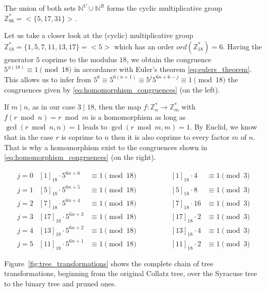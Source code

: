 \par\medskip
The union of both sets $\mathbb{N}^U\cup\mathbb{N}^R$ forms the cyclic multiplicative group $\mathbb{Z}^\ast_{96}=<\{5, 17, 31\}>$.

\par\medskip
Let us take a closer look at the (cyclic) multiplicative group $\mathbb{Z}^\ast_{18}=\{1,5,7,11,13,17\}=<5>$ which has an order $ord(\mathbb{Z}^\ast_{18})=6$. Having the generator $5$ coprime to the modulus $18$, we obtain the congruence $5^{\phi(18)}\equiv1\pmod{18}$ in accordance with Euler's theorem \ref{eq:eulers_theorem}. This allows us to infer from $5^6\equiv5^{6(n+1)}\equiv5^j5^{6n+6-j}\equiv1\pmod{18}$ the congruences given by \ref{eq:homomorphism_congruences} (on the left).

If $m\mid n$, as in our case $3\mid18$, then the map $f:\mathbb{Z}^\ast_n\rightarrow \mathbb{Z}^\ast_m$ with $f(r\bmod n)=r\bmod m$ is a homomorphism as long as $\gcd(r\bmod n,n)=1$ leads to $\gcd(r\bmod m,m)=1$. By Euclid, we know that in the case $r$ is coprime to $n$ then it is also coprime to every factor $m$ of $n$. That is why a homomorphism exist to the congruences shown in \ref{eq:homomorphism_congruences} (on the right).

\begin{equation}
\label{eq:homomorphism_congruences}
\begin{array}{lllll}
	j=0 & [1]_{18}\cdot5^{6n+6}&\equiv1\pmod{18}&\hspace{4em}[1]_{18}\cdot4 &\equiv1\pmod{3}\\
	j=1 & [5]_{18}\cdot5^{6n+5}&\equiv1\pmod{18}&\hspace{4em}[5]_{18}\cdot8 &\equiv1\pmod{3}\\
	j=2 & [7]_{18}\cdot5^{6n+4}&\equiv1\pmod{18}&\hspace{4em}[7]_{18}\cdot16 &\equiv1\pmod{3}\\
	j=3 & [17]_{18}\cdot5^{6n+3}&\equiv1\pmod{18}&\hspace{4em}[17]_{18}\cdot2 &\equiv1\pmod{3}\\
	j=4 & [13]_{18}\cdot5^{6n+2}&\equiv1\pmod{18}&\hspace{4em}[13]_{18}\cdot4 &\equiv1\pmod{3}\\
	j=5 & [11]_{18}\cdot5^{6n+1}&\equiv1\pmod{18}&\hspace{4em}[11]_{18}\cdot2 &\equiv1\pmod{3}
\end{array}
\end{equation}

Figure~\ref{fig:tree_transformations} shows the complete chain of tree transformations, beginning from the original Collatz tree, over the Syracuse tree to the binary tree and pruned ones.

